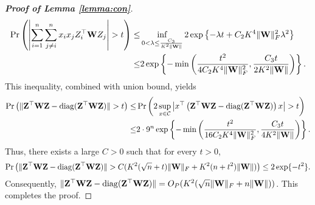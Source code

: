 \documentclass[11pt]{article}
\DeclareMathOperator{\mydiag}{diag}
\DeclareMathOperator{\myE}{E}
\theoremstyle{plain}
\theoremstyle{definition}
\theoremstyle{remark}
\begin{document}
\begin{appendices}
\begin{proof}[\textbf{Proof of Lemma \ref{lemma:con}}]
\begin{equation*}
\begin{split}
        \Pr\left(
 \left|
 \sum_{i=1}^{n} \sum_{j\neq i}^n
 x_i x_j Z_i^\top \mathbf{W} Z_j  
 \right| > t
        \right) 
 \leq
        &\inf_{0<\lambda\leq \frac{C_3}{ K^2 \|\mathbf{W}\|}}
        2\exp\left\{-\lambda t + C_2  K^4\|\mathbf{W}\|_F^2 \lambda^2 \right\}
        \\
        \leq
        &
        2\exp\left\{
            -\min\left(
                \frac{t^2}{4 C_2  K^4 \|\mathbf{W}\|^2_F}
                ,
                \frac{C_3 t}{2  K^2 \|\mathbf{W}\|}
            \right)
        \right\}.
    \end{split}
\end{equation*}
This inequality, combined with union bound, yields
\begin{equation*}
    \begin{split}
        \Pr\left(\|\BZ^\top \BW \BZ - \mydiag(\BZ^\top \BW \BZ)\|>t\right)
        \leq &
        \Pr\left(
        2 \sup_{x\in\mathcal C} \left|x^\top \left(\BZ^\top \BW \BZ - \mydiag(\BZ^\top \BW \BZ) \right) x\right|
        >t
    \right)
    \\
    \leq&
    2\cdot 9^n
\exp\left\{
            -\min\left(
                \frac{t^2}{16 C_2  K^4 \|\BW\|^2_F}
                ,
                \frac{C_3 t}{4  K^2 \|\BW\|}
            \right)
        \right\}
        .
    \end{split}
\end{equation*}
Thus, there exists a large $C>0$ such that for every $t>0$,
\begin{equation*}
        \Pr\left(\|\BZ^\top \BW \BZ - \mydiag(\BZ^\top \BW \BZ)\|>
            C(K^2 (\sqrt {n}+t) \|\BW\|_F + K^2 (n+t^2) \|\BW\|)
        \right)
        \leq 2\exp\{-t^2\}.
\end{equation*}
Consequently,  $\|\BZ^\top \BW \BZ - \mydiag(\BZ^\top \BW \BZ)\|=O_P(K^2(\sqrt n \|\BW\|_F+ n \|\BW\|))$.
This completes the proof.




 
\end{proof}


\end{appendices}
\end{document}

